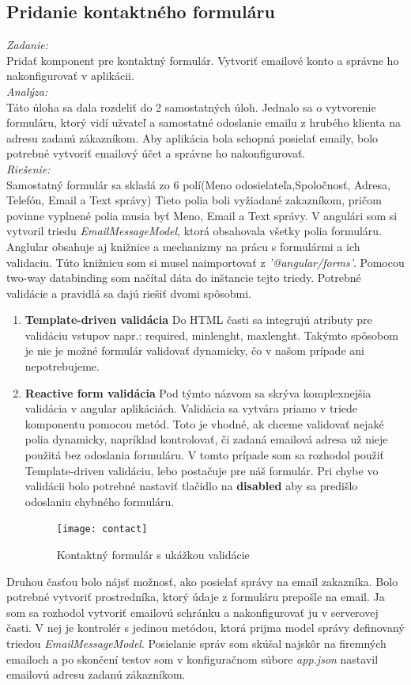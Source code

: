 \documentclass[11pt, oneside]{report}
\begin{document}
\subsection{Pridanie kontaktného formuláru }
\textit{Zadanie:}\\
Pridať komponent pre kontaktný formulár. Vytvoriť emailové konto a správne ho nakonfigurovať v aplikácii.
\\\textit{Analýza:}\\
Táto úloha sa dala rozdeliť do 2 samostatných úloh. Jednalo sa o vytvorenie formuláru, ktorý vidí užvateľ a samostatné odoslanie emailu z hrubého klienta na adresu zadanú zákazníkom. Aby aplikácia bola schopná posielať emaily, bolo potrebné vytvoriť emailový účet a správne ho nakonfigurovať.
\\\textit{Riešenie:}\\
Samostatný formulár sa skladá zo 6 polí(Meno odosielateľa,Spoločnosť, Adresa, Telefón, Email a Text správy) Tieto polia boli vyžiadané zakazníkom, pričom povinne vyplnené polia musia byť Meno, Email a Text správy. V angulári som si vytvoril triedu \textit{EmailMessageModel}, ktorá obsahovala všetky polia formuláru. Anglular obsahuje aj knižnice a mechanizmy na prácu s formulármi a ich validaciu. Túto knižnicu som si musel naimportovať z  \textit{'@angular/forms'}. Pomocou two-way databinding som načítal dáta  do inštancie tejto triedy. Potrebné validácie a pravidlá sa dajú riešiť dvomi spôsobmi. 
\begin{enumerate}
\item\textbf{Template-driven validácia} Do HTML časti  sa integrujú  atributy pre validáciu vstupov napr.: \textsf{required, minlenght, maxlenght}. Takýmto spôsobom  je nie je možné formulár validovať dynamicky, čo v našom prípade ani nepotrebujeme.
\item\textbf{Reactive form validácia} Pod týmto názvom sa skrýva komplexnejšia  validácia v angular aplikáciách. Validácia sa vytvára priamo v triede komponentu pomocou metód. Toto je vhodné, ak chceme validovať nejaké polia dynamicky, napríklad kontrolovať, či  zadaná emailová adresa  už nieje použitá bez odoslania formuláru.
 V tomto prípade som sa rozhodol použiť Template-driven validáciu, lebo postačuje pre náš  formulár. Pri chybe vo validácii   bolo potrebné nastaviť tlačidlo na \textbf{disabled} aby sa predišlo odoslaniu chybného formuláru.
\begin{figure}[H]
    \centering
    \texttt{[image: contact]}
    \caption{Kontaktný formulár s ukážkou validácie }
    \label{fig:contactform}
\end{figure}
\end{enumerate} 
 Druhou časťou bolo nájsť možnosť, ako posielať správy na email zakazníka. Bolo potrebné vytvoriť prostredníka, ktorý údaje z formuláru prepošle na email.  Ja som sa rozhodol vytvoriť emailovú schránku a nakonfigurovať ju v serverovej časti. V nej je kontrolér s jedinou metódou, ktorá prijma model správy definovaný  triedou \textit{EmailMessageModel}. Posielanie správ som skúšal najskôr na firemných emailoch a po  skončení testov som v konfiguračnom súbore \textit{app.json} nastavil emailovú adresu zadanú zákazníkom.
\end{document}
